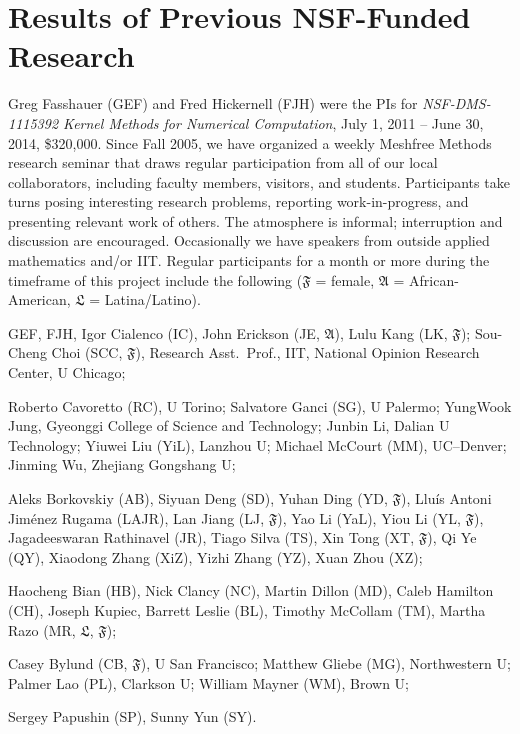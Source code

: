 \documentclass[11pt]{NSFamsart}
\newcommand{\fA}{\mathfrak{A}}
\newcommand{\fF}{\mathfrak{F}}
\newcommand{\fL}{\mathfrak{L}}
\begin{document}
\section{Results of Previous NSF-Funded Research}\label{SectPrevious}

Greg Fasshauer (GEF) and Fred Hickernell (FJH) were the PIs for \emph{NSF-DMS-1115392 Kernel Methods for Numerical Computation}, July 1, 2011 -- June 30, 2014, \$320,000.  Since Fall 2005, we have organized a weekly Meshfree Methods research seminar that draws regular participation from all of our local collaborators, including faculty members, visitors, and students.  Participants take turns posing interesting research problems, reporting work-in-progress, and presenting relevant work of others.  The atmosphere is informal; interruption and discussion are encouraged.  Occasionally we have speakers from outside applied mathematics and/or IIT. Regular participants for a month or more during the timeframe of this project include the following ($\fF$ = female,  $\fA$ = African-American, $\fL$ = Latina/Latino).

\begin{description}[leftmargin=2.5ex]
\item[IIT Faculty] GEF, FJH, Igor Cialenco (IC), John Erickson (JE, $\fA$), Lulu Kang (LK, $\fF$); Sou-Cheng Choi (SCC, $\fF$), Research Asst.\ Prof., IIT, National Opinion Research Center, U Chicago;
\item[Visitors] Roberto Cavoretto (RC), U Torino;  Salvatore Ganci (SG), U Palermo; YungWook Jung, Gyeonggi College of Science and Technology; Junbin Li, Dalian U Technology; Yiuwei Liu (YiL), Lanzhou U; Michael McCourt (MM), UC--Denver; Jinming Wu, Zhejiang Gongshang U;
\item[IIT Graduate Students] Aleks Borkovskiy (AB), Siyuan Deng (SD), Yuhan Ding (YD, $\fF$), Llu\'is Antoni Jim\'enez Rugama (LAJR), Lan Jiang (LJ, $\fF$), Yao Li (YaL), Yiou Li (YL, $\fF$), Jagadeeswaran Rathinavel (JR), Tiago Silva (TS), Xin Tong (XT, $\fF$), Qi Ye (QY), Xiaodong Zhang (XiZ), Yizhi Zhang (YZ), Xuan Zhou (XZ);
\item[IIT Undergraduate Students] Haocheng Bian (HB), Nick Clancy (NC), Martin Dillon (MD), Caleb Hamilton (CH), Joseph Kupiec, Barrett Leslie (BL), Timothy McCollam (TM), Martha Razo (MR, $\fL$, $\fF$);
\item[Other Undergraduate Students] Casey Bylund (CB, $\fF$), U San Francisco; Matthew Gliebe (MG), Northwestern U; Palmer Lao (PL), Clarkson U; William Mayner (WM), Brown U;
\item[High School Students] Sergey Papushin (SP), Sunny Yun (SY).
\end{description}
\end{document}
